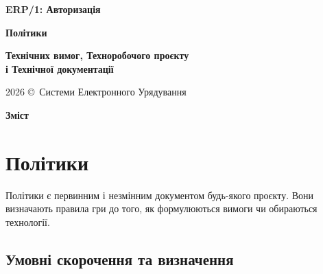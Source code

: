 \documentclass{article}
\newcommand\HUGE[1]{\fontsize{40}{40}\selectfont #1}
\begin{document}
\pagestyle{fancy}

\begin{titlepage}
  \AddToShipoutPictureBG*{\AtPageLowerLeft{\color{nato}\rule{\paperwidth}{\paperheight}}}
  \color{white}\thispagestyle{empty}\vspace*{4cm}\centering
  {\Huge  \textbf{ERP/1: Авторизація} \par} \vspace{2cm}
  {\HUGE  \textbf{Політики} \par} \vspace{2.5cm}
  {\LARGE \textbf{Технічних вимог, Техноробочого проєкту \\ і Технічної документації} \par} \vspace{2.5cm}
  \vfill
  {\large 2026 \copyright\ Системи Електронного Урядування \par}
\end{titlepage}

\newpage

\begin{center}
  {\Huge\color{nato}\bfseries Зміст\par}
\end{center}
\vspace{40pt}
\tableofcontents

\begin{abstract}
  У статті подаються універсальні засади політик проектів для
  державних ІТ підприємств, типовий зміст технічних вимог з повною таксономією підрозділів та
  структурою технічного завдання відповідно до ДСТУ.
  Показані принципи, як політики визначають вимоги, що узгоджують технічне завдання та посилання на ключові
  державні стандарти документування ДСТУ. Матеріал призначений для архітекторів, аналітиків та розробників,
  які працюють над державними та комерційними проєктами в Україні.
\end{abstract}

\newpage

\section{Політики}

Політики є первинним і незмінним документом будь-якого проєкту.
Вони визначають правила гри до того, як формулюються вимоги чи обираються технології.

\subsection*{Умовні скорочення та визначення}
\end{document}
